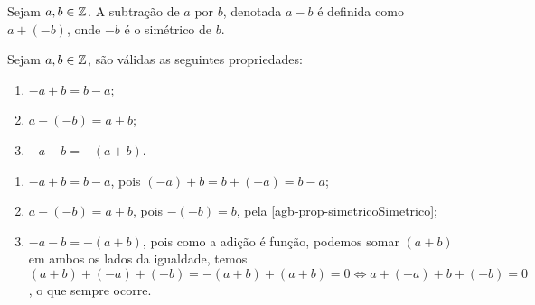 \documentclass[../main.tex]{subfiles}
\begin{document}
\begin{defi}
    Sejam $a,b \in \mathbb{Z}$. A subtração de $a$ por $b$, denotada $a - b$ é definida como $a + (-b)$, onde $-b$ é o simétrico de $b$.
\end{defi}
\begin{prop} Sejam $a,b \in \mathbb{Z}$, são válidas as seguintes propriedades:
    \begin{enumerate}[label=(\roman*)]
        \item $-a + b = b - a$;
        \item $a - ( - b) = a+b$;
        \item $-a-b = -(a+b)$.
    \end{enumerate}
\end{prop}
\begin{dem}
        \begin{enumerate}[label=(\roman*)]
        \item $-a + b = b - a$, pois $(-a) + b = b + (-a) = b-a$;
        \item $a - ( - b) = a+b$, pois $-(-b) = b$, pela \cref{agb-prop-simetricoSimetrico};
        \item $-a-b = -(a+b)$, pois como a adição é função, podemos somar $(a+b)$ em ambos os lados da igualdade, temos
        $(a+b)+(-a)+(-b) = -(a+b) + (a+b) = 0 \iff a+(-a) + b+(-b) = 0$, o que sempre ocorre.
    \end{enumerate}
\end{dem}
\end{document}
